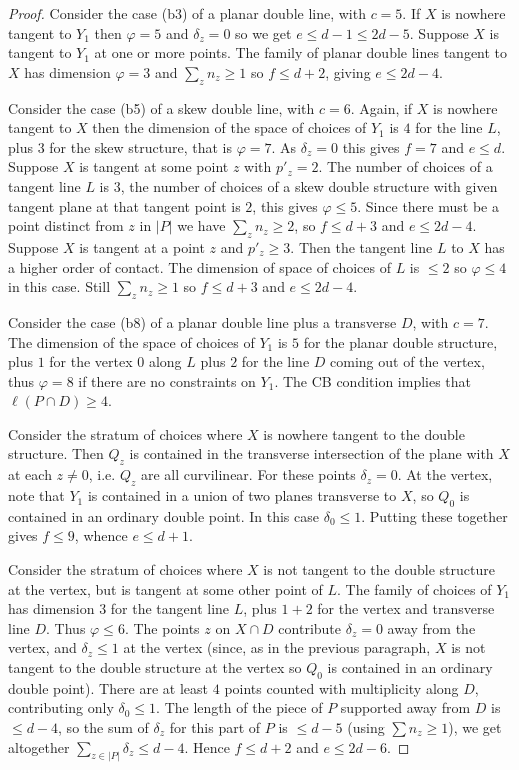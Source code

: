 \documentclass{amsart}
\theoremstyle{plain}
\numberwithin{equation}{section}
\begin{document}
\begin{proof}
Consider the case (b3) of a planar double line, 
with $c=5$. If $X$ is nowhere tangent to $Y_1$ then
$\varphi =5$ and $\delta _z=0$ so we get $e\leq d-1\leq 2d-5$. Suppose
$X$ is tangent to $Y_1$ at one or more points. The family of planar double lines
tangent to $X$ has dimension $\varphi = 3$ and 
$\sum _zn_z \geq 1$ so $f\leq d+2$, giving $e\leq 2d-4$. 

Consider the case (b5) of a skew double line, 
with $c= 6$. Again, if $X$ is nowhere tangent 
to $X$ then the dimension of the space of choices of $Y_1$ is $4$ for the line $L$,
plus $3$ for the skew structure, that is $\varphi = 7$. 
As $\delta_z=0$ this gives $f=7$ and  $e\leq d$. 
Suppose $X$ is tangent at some point $z$ with $p'_z=2$. 
The number of choices of a tangent line $L$ is $3$,
the number of choices of a skew double structure with given tangent plane at that
tangent point is $2$, this gives $\varphi \leq 5$. Since there must be
a point distinct from $z$ in $|P|$ we have $\sum _zn_z \geq 2$,
so $f\leq d+3$ and $e\leq 2d-4$. Suppose $X$ is tangent at a point $z$ and
$p'_z\geq 3$. Then the tangent line $L$ to $X$ has a higher order of contact.
The dimension of space of choices of $L$ is $\leq 2$ so $\varphi \leq 4$
in this case. Still  $\sum _zn_z \geq 1$ so $f\leq d+3$ and $e\leq 2d-4$. 

Consider the case (b8) of a planar double line plus a transverse $D$, with $c=7$.
The dimension of the space of choices of $Y_1$ is $5$ for the planar double
structure, plus $1$ for the vertex $0$ along $L$ plus $2$ for the line $D$
coming out of the vertex, thus $\varphi = 8$ if there are no constraints on $Y_1$. 
The CB condition implies that $\ell (P\cap D)\geq 4$. 

Consider the stratum of choices
where $X$ is nowhere tangent to the double structure. Then $Q_z$ is contained
in the transverse intersection of the plane with $X$ at each $z\neq 0$, i.e. $Q_z$ are
all curvilinear. For these points $\delta _z=0$.
At the vertex, note that $Y_1$ is contained in a union of
two planes transverse to $X$, so $Q_0$ is contained in an ordinary double point.
In this case $\delta _0\leq 1$. Putting these together gives
$f\leq 9$, whence $e\leq d+1$.

Consider the stratum of choices where $X$ is not tangent to the double
structure at the vertex, but is tangent at some other point of $L$.
The family of choices of $Y_1$ has dimension $3$ for the tangent line $L$,
plus $1+2$ for the vertex and transverse line $D$. Thus $\varphi \leq 6$.
The points $z$ on $X\cap D$
contribute $\delta _z =0$ away from the vertex, and $\delta _z\leq 1$ at the
vertex (since, as in the previous paragraph, $X$ is not tangent to the double
structure at the vertex so $Q_0$ is contained in an ordinary double point).
There are at least $4$ points counted with multiplicity along $D$, contributing only
$\delta _0\leq 1$. The length of the piece of $P$ supported away from $D$ is $\leq d-4$, so
the sum of
$\delta _z$ for this part of $P$ is $\leq d-5$ (using $\sum n_z\geq 1$),
we get altogether $\sum _{z\in |P|}\delta _z\leq d-4$. Hence $f\leq d+2$ and $e\leq 2d-6$.


\end{proof}
\end{document}
